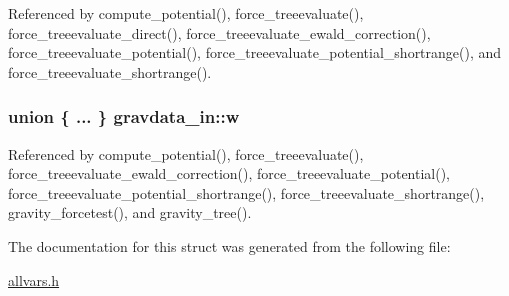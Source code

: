 Referenced by compute\_\-potential(), force\_\-treeevaluate(), force\_\-treeevaluate\_\-direct(), force\_\-treeevaluate\_\-ewald\_\-correction(), force\_\-treeevaluate\_\-potential(), force\_\-treeevaluate\_\-potential\_\-shortrange(), and force\_\-treeevaluate\_\-shortrange().

\hypertarget{structgravdata__in_aa49666c565d68dcd6c3b6a6015f8a51f}{
\subsubsection[{w}]{\setlength{\rightskip}{0pt plus 5cm}union \{ ... \} 
   {\bf gravdata\_\-in::w}}}
\label{structgravdata__in_aa49666c565d68dcd6c3b6a6015f8a51f}


Referenced by compute\_\-potential(), force\_\-treeevaluate(), force\_\-treeevaluate\_\-ewald\_\-correction(), force\_\-treeevaluate\_\-potential(), force\_\-treeevaluate\_\-potential\_\-shortrange(), force\_\-treeevaluate\_\-shortrange(), gravity\_\-forcetest(), and gravity\_\-tree().



The documentation for this struct was generated from the following file:\begin{DoxyCompactItemize}
\item 
\hyperlink{allvars_8h}{allvars.h}\end{DoxyCompactItemize}
